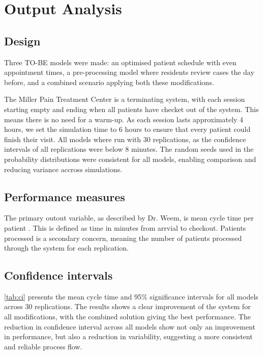 \section{Output Analysis}

\subsection{Design}

Three TO-BE models were made: an optimised patient schedule with even appointment times, a pre-processing model where residents review cases the day before, and a combined scenario applying both these modifications.

The Miller Pain Treatment Center is a terminating system, with each session starting empty and ending when all patients have checket out of the system. This means there is no need for a warm-up.
As each session lasts approximately 4 hours, we set the simulation time to 6 hours to ensure that every patient could finish their visit. All models where run with 30 replications, as the confidence intervals of all replications were below 8 minutes. The random seeds used in the probability distributions were consistent for all models, enabling comparison and reducing variance accross simulations.

\subsection{Performance measures}

The primary outout variable, as described by Dr. Weem, is mean cycle time per patient \parencite{MillerPainTreatmentCenter}. This is defined as time in minutes from arrvial to checkout. Patients processed is a secondary concern, meaning the number of patients processed through the system for each replication.

\subsection{Confidence intervals}

\autoref{tab:ci} presents the mean cycle time and 95\% significance intervals for all models across 30 replications. The results shows a clear improvement of the system for all modifications, with the combined solution giving the best performance. The reduction in confidence interval across all models show not only an improvement in performance, but also a reduction in variability, suggesting a more consistent and reliable process flow.

